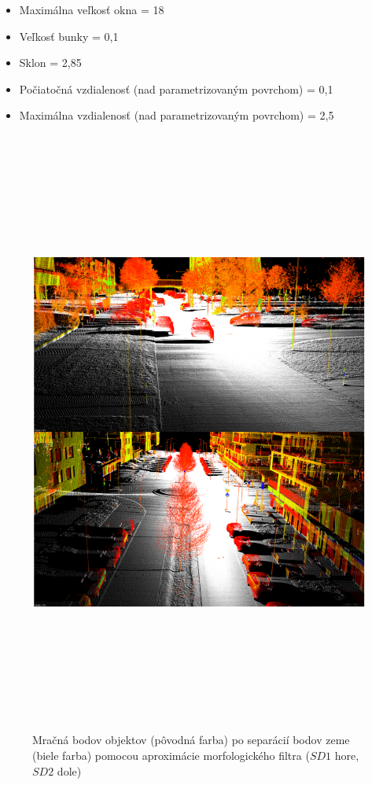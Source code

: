 \begin{itemize}
    \setlength\itemsep{0.2em}
    \item Maximálna veľkosť okna = 18
    \item Veľkosť bunky = 0,1
    \item Sklon = 2,85
    \item Počiatočná vzdialenosť (nad parametrizovaným povrchom) = 0,1
    \item Maximálna vzdialenosť (nad parametrizovaným povrchom) = 2,5
\end{itemize}

\newpage\vfill
\begin{figure}[ht]
  \centering
  \includegraphics[width=16cm, height=20cm]{img/morph_filter.png}
  \caption{Mračná bodov objektov (pôvodná farba) po separácií bodov zeme (biele farba) pomocou aproximácie morfologického filtra ($SD1$ hore, $SD2$ dole)} 
  \label{fig:ground_sep}
\end{figure} 
\vfill\clearpage

